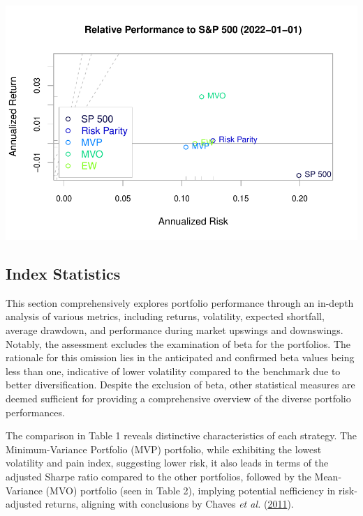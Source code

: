 \documentclass[12pt,preprint, authoryear]{elsarticle}
\let\origfigure\figure
\let\endorigfigure\endfigure
\renewenvironment{figure}[1][2] {
    \expandafter\origfigure\expandafter[H]
} {
    \endorigfigure
}
\numberwithin{equation}{section}
\numberwithin{figure}{section}
\numberwithin{table}{section}
\begin{document}
\begin{figure}[H]

{\centering \includegraphics{Finmetrics_Project_files/figure-latex/Figure8-1} 

}

\caption{Annualized Risk-return performance of portfolios relative to SP 500 since January 2022 \label{Figure8}}\label{fig:Figure8}
\end{figure}

\hypertarget{index-statistics}{%
\subsection{Index Statistics}\label{index-statistics}}

This section comprehensively explores portfolio performance through an
in-depth analysis of various metrics, including returns, volatility,
expected shortfall, average drawdown, and performance during market
upswings and downswings. Notably, the assessment excludes the
examination of beta for the portfolios. The rationale for this omission
lies in the anticipated and confirmed beta values being less than one,
indicative of lower volatility compared to the benchmark due to better
diversification. Despite the exclusion of beta, other statistical
measures are deemed sufficient for providing a comprehensive overview of
the diverse portfolio performances.

The comparison in Table 1 reveals distinctive characteristics of each
strategy. The Minimum-Variance Portfolio (MVP) portfolio, while
exhibiting the lowest volatility and pain index, suggesting lower risk,
it also leads in terms of the adjusted Sharpe ratio compared to the
other portfolios, followed by the Mean-Variance (MVO) portfolio (seen in
Table 2), implying potential nefficiency in risk-adjusted returns,
aligning with conclusions by Chaves \emph{et al.}
(\protect\hyperlink{ref-chaves2011risk}{2011}).
\end{document}
